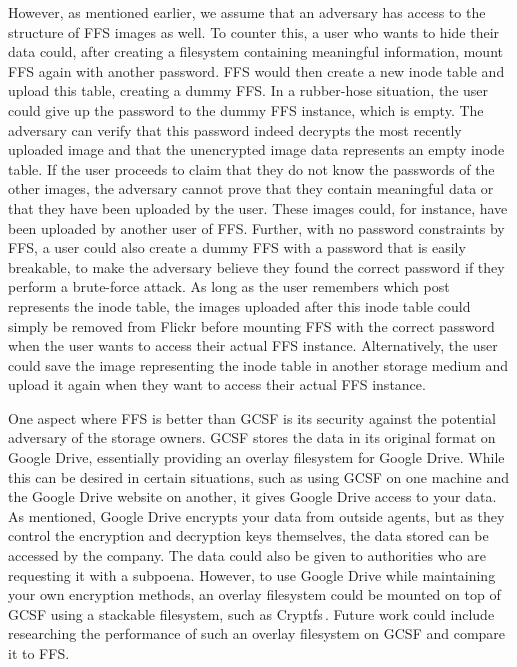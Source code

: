 However, as mentioned earlier, we assume that an adversary has access to the structure of \gls{FFS} images as well. To counter this, a user who wants to hide their data could, after creating a filesystem containing meaningful information, mount \gls{FFS} again with another password. \gls{FFS} would then create a new inode table and upload this table, creating a dummy \gls{FFS}. In a \mbox{rubber-hose} situation, the user could give up the password to the dummy \gls{FFS} instance, which is empty. The adversary can verify that this password indeed decrypts the most recently uploaded image and that the unencrypted image data represents an empty inode table. If the user proceeds to claim that they do not know the passwords of the other images, the adversary cannot prove that they contain meaningful data or that they have been uploaded by the user. These images could, for instance, have been uploaded by another user of \gls{FFS}. Further, with no password constraints by \gls{FFS}, a user could also create a dummy \gls{FFS} with a password that is easily breakable, to make the adversary believe they found the correct password if they perform a \mbox{brute-force} attack. As long as the user remembers which post represents the inode table, the images uploaded after this inode table could simply be removed from Flickr before mounting \gls{FFS} with the correct password when the user wants to access their actual \gls{FFS} instance. Alternatively, the user could save the image representing the inode table in another storage medium and upload it again when they want to access their actual \gls{FFS} instance.

One aspect where \gls{FFS} is better than \gls{GCSF} is its security against the potential adversary of the storage owners. \gls{GCSF} stores the data in its original format on Google Drive, essentially providing an overlay filesystem for Google Drive. While this can be desired in certain situations, such as using \gls{GCSF} on one machine and the Google Drive website on another, it gives Google Drive access to your data. As mentioned, Google Drive encrypts your data from outside agents, but as they control the encryption and decryption keys themselves, the data stored can be accessed by the company. The data could also be given to authorities who are requesting it with a subpoena. However, to use Google Drive while maintaining your own encryption methods, an overlay filesystem could be mounted on top of \gls{GCSF} using a stackable filesystem, such as Cryptfs\,\cite{zadokCryptfsStackableVnode1998}. Future work could include researching the performance of such an overlay filesystem on \gls{GCSF} and compare it to \gls{FFS}.

